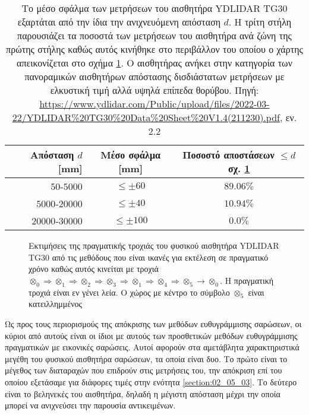 \begin{table}[h]\centering \vspace{0.5cm}
  \begin{tabular}{rcc}
    Απόσταση $d$ [mm]   & Μέσο σφάλμα [mm]    & Ποσοστό αποστάσεων $\leq d$ σχ. \ref{fig:02_05_04:03} \\ \toprule
    $50$-$5000$         & $\leq \pm 60$       & $89.06\%$  \\
    $5000$-$20000$      & $\leq \pm 40$       & $10.94\%$  \\
    $20000$-$30000$     & $\leq \pm 100$      & $0.0\%$    \\  \bottomrule
  \end{tabular}
  \caption{\small Το μέσο σφάλμα των μετρήσεων του αισθητήρα YDLIDAR TG30
           εξαρτάται από την ίδια την ανιχνευόμενη απόσταση $d$. Η τρίτη στήλη
           παρουσιάζει τα ποσοστά των μετρήσεων του αισθητήρα ανά ζώνη της
           πρώτης στήλης καθώς αυτός κινήθηκε στο περιβάλλον του οποίου ο
           χάρτης απεικονίζεται στο σχήμα \ref{fig:02_05_04:03}. Ο αισθητήρας
           ανήκει στην κατηγορία των πανοραμικών αισθητήρων απόστασης
           δισδιάστατων μετρήσεων με ελκυστική τιμή αλλά υψηλά επίπεδα
           θορύβου. Πηγή: \url{https://www.ydlidar.com/Public/upload/files/2022-03-22/YDLIDAR\%20TG30\%20Data\%20Sheet\%20V1.4(211230).pdf}, εν. 2.2}
  \label{tbl:02:05_04:tg30}
\end{table}

\begin{figure}[]\centering
  
  \caption{\small Εκτιμήσεις της πραγματικής τροχιάς του φυσικού αισθητήρα
           YDLIDAR TG30 από τις μεθόδους που είναι ικανές για εκτέλεση σε
           πραγματικό χρόνο καθώς αυτός κινείται με τροχιά $\otimes_0
           \Rightarrow \otimes_1 \Rightarrow \otimes_2 \Rightarrow \otimes_3
           \Rightarrow \otimes_1 \Rightarrow \otimes_4 \Rightarrow \otimes_5
           \rightarrow \otimes_0$. Η πραγματική τροχιά είναι εν γένει λεία.
           Ο χώρος με κέντρο το σύμβολο $\otimes_5$ είναι κατειλλημμένος}
  \label{fig:02_05_04:03}
\end{figure}


Ως προς τους περιορισμούς της απόκρισης των μεθόδων ευθυγράμμισης σαρώσεων, οι
κύριοι από αυτούς είναι οι ίδιοι με αυτούς των προσθετικών μεθόδων
ευθυγράμμισης πραγματικών με εικονικές σαρώσεις. Αυτοί αφορούν στα αμετάβλητα
χαρακτηριστικά μεγέθη του φυσικού αισθητήρα σαρώσεων, τα οποία είναι δυο. Το
πρώτο είναι το μέγεθος των διαταραχών που επιδρούν στις μετρήσεις του, την
απόκριση επί του οποίου εξετάσαμε για διάφορες τιμές στην ενότητα
\ref{section:02_05_03}. Το δεύτερο είναι το βεληνεκές του αισθητήρα, δηλαδή η
μέγιστη απόσταση μέχρι την οποία μπορεί να ανιχνεύσει την παρουσία
αντικειμένων.

